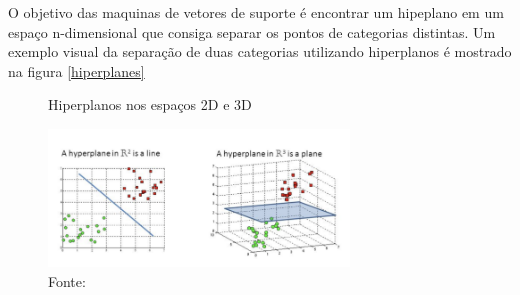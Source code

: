 O objetivo das maquinas de vetores de suporte é encontrar um hipeplano em um espaço n-dimensional que consiga separar os pontos de categorias distintas. Um exemplo visual da separação de duas categorias utilizando  hiperplanos é mostrado na figura \ref{hiperplanes}

\begin{figure}[h]
\centering
\caption{Hiperplanos nos espaços 2D e 3D}
  \includegraphics[width=8cm]{"images/hiperplaneExample.png"}
  \centering
\caption*{Fonte: }%
\label{fig: hiperplanes}
\end{figure} 

